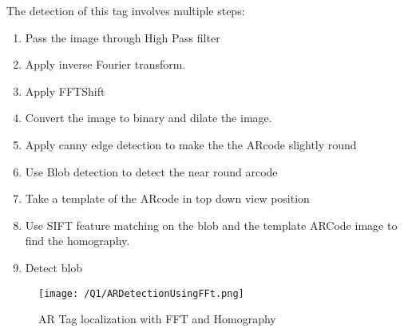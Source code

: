 \documentclass[a4paper, 10pt]{article}
\begin{document}
\begin{multicols}{2}
		
		The detection of this tag involves multiple steps:
		\begin{enumerate}
			\item Pass the image through High Pass filter
			\item Apply inverse Fourier transform.
			\item Apply FFTShift
			\item Convert the image to binary and dilate the image. 
			\item Apply canny edge detection to make the the ARcode slightly round
			\item Use Blob detection to detect the near round arcode
			\item Take a template of the ARcode in top down view position
			\item Use SIFT feature matching on the blob and the template ARCode image to find the homography.
			\item Detect blob 
			
		\end{enumerate}
		
		\begin{figure}[H]
			\centering
			\texttt{[image: /Q1/ARDetectionUsingFFt.png]}
			\caption{AR Tag localization with FFT and Homography}
			\label{fig:FFT}
		\end{figure}
		
		\begin{comment}
		
		\begin{figure*}
		\centering
		\texttt{[image: /Q1/ARDetectionUsingFFt.png]}
		\caption{Projecting the Testudo image on the ARTag}
		\label{fig:ARTa1g}
		\end{figure*}
		
		\end{comment}
		

\end{multicols}
\end{document}
